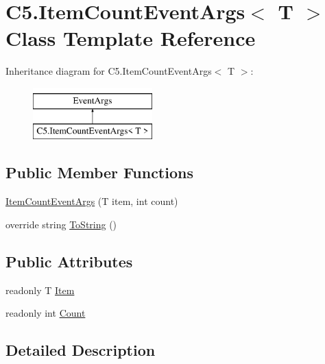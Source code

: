 \hypertarget{class_c5_1_1_item_count_event_args}{}\section{C5.\+Item\+Count\+Event\+Args$<$ T $>$ Class Template Reference}
\label{class_c5_1_1_item_count_event_args}


 


Inheritance diagram for C5.\+Item\+Count\+Event\+Args$<$ T $>$\+:\begin{figure}[H]
\begin{center}
\leavevmode
\includegraphics[height=2.000000cm]{class_c5_1_1_item_count_event_args}
\end{center}
\end{figure}
\subsection*{Public Member Functions}
\begin{DoxyCompactItemize}
\item 
\hyperlink{class_c5_1_1_item_count_event_args_a6d8452024be555a6d44e30aa1d5e5736}{Item\+Count\+Event\+Args} (T item, int count)
\item 
override string \hyperlink{class_c5_1_1_item_count_event_args_a9f059afc3c5b31d54d1a6a1319566185}{To\+String} ()
\end{DoxyCompactItemize}
\subsection*{Public Attributes}
\begin{DoxyCompactItemize}
\item 
readonly T \hyperlink{class_c5_1_1_item_count_event_args_aa2cebc5c33bea75a4891fe7f1a4ee4da}{Item}
\item 
readonly int \hyperlink{class_c5_1_1_item_count_event_args_a7038a3e4072fd1c92730447832690ab3}{Count}
\end{DoxyCompactItemize}


\subsection{Detailed Description}



